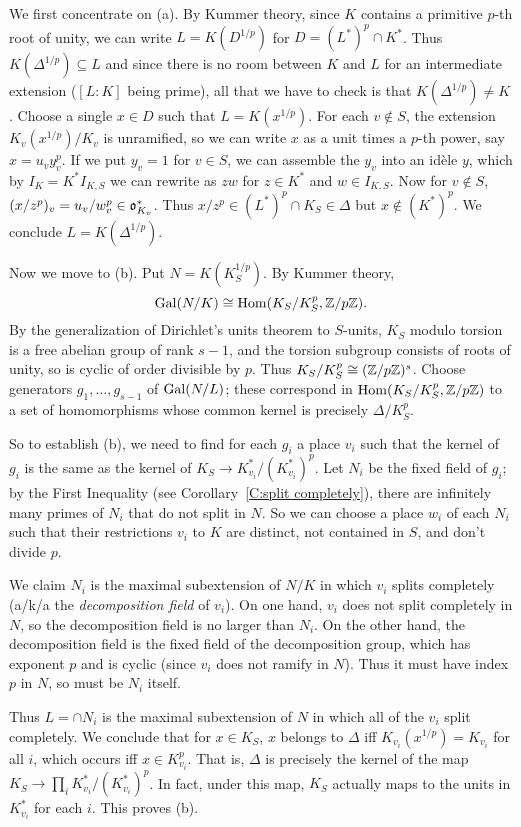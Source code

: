 We first concentrate on (a).
By Kummer theory, since $K$ contains a
primitive $p$-th root of unity, we can write $L = K(D^{1/p})$ for
$D = (L^*)^p \cap K^*$. Thus $K(\Delta^{1/p}) \subseteq L$ and
since there is no room between $K$ and $L$ for an intermediate extension ($[L:K]$
being prime),
all that we have to check is that 
$K(\Delta^{1/p}) \neq K$.
Choose a single $x \in D$ such that $L = K(x^{1/p})$.
For each $v \notin S$, the extension $K_v(x^{1/p})/K_v$ is unramified,
so we can write $x$ as a unit times a $p$-th power, say
$x = u_v y_v^p$. If we put $y_v = 1$ for $v \in S$, we can assemble the
$y_v$ into an id\`ele $y$, which by $I_K = K^* I_{K,S}$ we can rewrite as
$zw$ for $z \in K^*$ and $w \in I_{K,S}$. Now for $v \notin S$,
$(x/z^p)_v = u_v/w_v^p \in \mathfrak{o}_{K_v}^*$. Thus $x/z^p \in (L^*)^p \cap
K_S \in \Delta$ but $x \notin (K^*)^p$. We conclude $L
= K(\Delta^{1/p})$.

Now we move to (b). Put $N = K(K_S^{1/p})$. By Kummer theory,
\[
\operatorname{Gal}(N/K) \cong \operatorname{Hom}(K_S/K_S^p, \mathbb{Z}/p\mathbb{Z}).
\]
By the generalization of Dirichlet's units theorem to $S$-units,
$K_S$ modulo torsion is a free abelian group of rank $s-1$,
and the torsion subgroup consists of roots of unity, so is cyclic
of order divisible by $p$. Thus $K_S/K_S^p \cong (\mathbb{Z}/p\mathbb{Z})^s$.
Choose generators $g_1, \dots, g_{s-1}$ of 
$\operatorname{Gal}(N/L)$; these correspond in $\operatorname{Hom}(K_S/K_S^p, \mathbb{Z}/p\mathbb{Z})$
to a set of homomorphisms whose common kernel is precisely
$\Delta/K_S^p$. 

So to establish (b), we need to find for each $g_i$
a place $v_i$ such that the kernel of $g_i$ is the same as the kernel of
$K_S \to K_{v_i}^*/(K_{v_i}^*)^p$. Let $N_i$ be the fixed field of $g_i$; 
by the First Inequality (see Corollary~\ref{C:split completely}), there are infinitely
many primes of $N_i$ that do not split in $N$. So we can choose
a place $w_i$ of each $N_i$ such that their restrictions $v_i$ to $K$ are
distinct, not contained in $S$, and don't divide $p$. 

We claim $N_i$ is
the maximal subextension of $N/K$ in which $v_i$ splits completely (a/k/a
the \emph{decomposition field} of $v_i$). On one hand, $v_i$ does not split
completely in $N$, so the decomposition field is no larger than $N_i$.
On the other hand, the decomposition field is the fixed field of
the decomposition group, which has exponent $p$ and is cyclic (since
$v_i$ does not ramify in $N$). Thus it must have index $p$ in $N$,
so must be $N_i$ itself.

Thus $L = \cap N_i$ is the maximal subextension of $N$ in which all of
the $v_i$ split completely. We conclude that for $x \in K_S$,
$x$ belongs to $\Delta$ iff $K_{v_i}(x^{1/p}) = K_{v_i}$ for all $i$,
which occurs iff $x \in K_{v_i}^p$. That is, $\Delta$ is precisely the
kernel of the map $K_S \to \prod_i K_{v_i}^*/(K_{v_i}^*)^p$.
In fact, under this map, $K_S$ actually maps to the units in
$K_{v_i}^*$ for each $i$. This proves (b).


